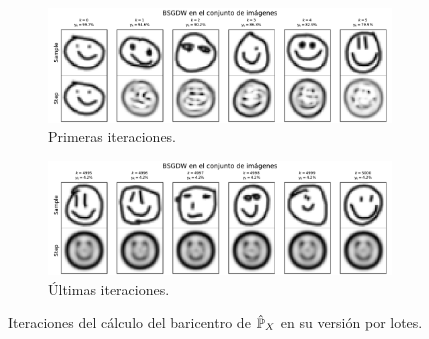 \begin{figure}[H]
    \centering
    \begin{subfigure}[b]{0.75\textwidth}
        \includegraphics[width=\textwidth]{img/sgdw-iters/batch-first-iters-DS.pdf}
        \caption{Primeras iteraciones.}
        \label{fig:batch-first-iters-DS}
    \end{subfigure}
    \begin{subfigure}[b]{0.75\textwidth}
        \includegraphics[width=\textwidth]{img/sgdw-iters/batch-last-iters-DS.pdf}
        \caption{Últimas iteraciones.}
        \label{fig:batch-last-iters-DS}
    \end{subfigure}
    \caption{Iteraciones del cálculo del baricentro de $\hat\Prob_X$ en su versión por lotes.}
    \label{fig:batch-iters-DS}
\end{figure}

